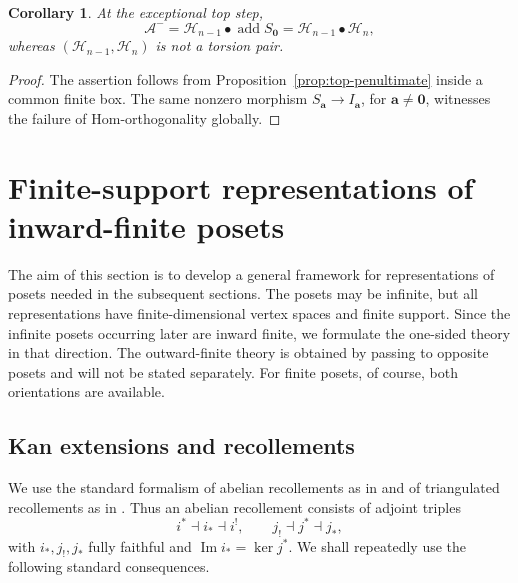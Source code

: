 \documentclass[12pt,reqno]{amsart}
\newtheorem{corollary}[theorem]{Corollary}
\theoremstyle{definition}
\theoremstyle{remark}
\begin{document}
\begin{corollary}\label{cor:global-top-extension}
At the exceptional top step,
\[
\mathcal A^-=
\mathcal H_{n-1}\bullet\operatorname{add}S_{\mathbf0}
=
\mathcal H_{n-1}\bullet\mathcal H_n,
\]
whereas $(\mathcal H_{n-1},\mathcal H_n)$ is not a torsion pair.
\end{corollary}

\begin{proof}
The assertion follows from Proposition~\ref{prop:top-penultimate} inside a
common finite box.  The same nonzero morphism
$S_{\mathbf a}\to I_{\mathbf a}$, for $\mathbf a\ne\mathbf0$, witnesses the
failure of Hom-orthogonality globally.
\end{proof}

\section{Finite-support representations of inward-finite posets}
\label{sec:general-fs-theory}

The aim of this section is to develop a general framework for representations
of posets needed in the subsequent sections.  The posets may be infinite, but
all representations have finite-dimensional vertex spaces and finite support.
Since the infinite posets occurring later are inward finite, we formulate the
one-sided theory in that direction.  The outward-finite theory is obtained by
passing to opposite posets and will not be stated separately.  For finite
posets, of course, both orientations are available.

\subsection{Kan extensions and recollements}
\label{subsec:recollement-background}
We use the standard formalism of abelian recollements as in
\cite{FP,Psaroudakis,PV} and of triangulated recollements as in \cite{BBD}.
Thus an abelian recollement
consists of adjoint triples
\[
i^*\dashv i_*\dashv i^!,
\qquad
j_!\dashv j^*\dashv j_*,
\]
with $i_*,j_!,j_*$ fully faithful and $\operatorname{Im}i_*=\ker j^*$.
We shall repeatedly use the following standard consequences.
\end{document}
